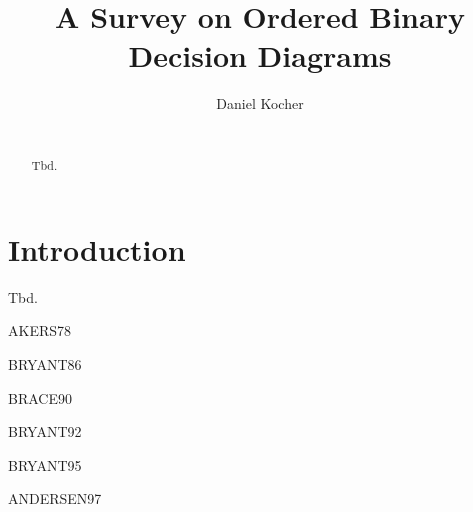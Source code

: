 \documentclass{vldb}
\begin{document}
\title{A Survey on Ordered Binary Decision Diagrams}


\author{
\alignauthor
	Daniel Kocher\\
    \\
}

\maketitle

\begin{abstract}
Tbd.
\end{abstract}

\section{Introduction}   
Tbd. \newline

\noindent AKERS78\cite{AKERS78} \newline

BRYANT86\cite{BRYANT86} \newline

BRACE90\cite{BRACE90} \newline

\noindent BRYANT92\cite{BRYANT92} \newline

BRYANT95\cite{BRYANT95} \newline

\noindent ANDERSEN97\cite{ANDERSEN97} \newline


\balance



\end{document}
